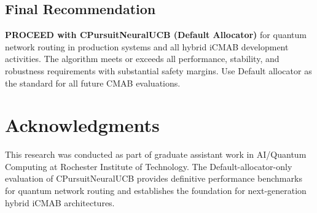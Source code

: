 \documentclass[12pt,a4paper]{article}
\newcommand{\success}[1]{\textcolor{accentgreen}{\textbf{#1}}}
\begin{document}
\subsection{Final Recommendation}

\begin{tcolorbox}[colback=accentgreen!20,colframe=accentgreen,title=\textbf{Deployment Recommendation}]
\success{\textbf{PROCEED with CPursuitNeuralUCB (Default Allocator)}} for quantum network routing in production systems and all hybrid iCMAB development activities. The algorithm meets or exceeds all performance, stability, and robustness requirements with substantial safety margins. Use Default allocator as the standard for all future CMAB evaluations.
\end{tcolorbox}

\section{Acknowledgments}

This research was conducted as part of graduate assistant work in AI/Quantum Computing at Rochester Institute of Technology. The Default-allocator-only evaluation of CPursuitNeuralUCB provides definitive performance benchmarks for quantum network routing and establishes the foundation for next-generation hybrid iCMAB architectures.
\end{document}
